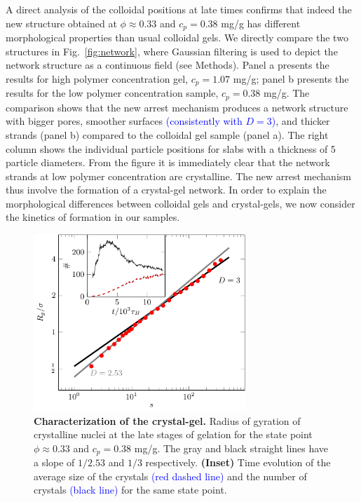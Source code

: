 \documentclass[preprint,amsmath,amssymb,superscriptaddress]{revtex4-1}
\begin{document}
A direct analysis of the colloidal positions at late times confirms that indeed the new structure obtained at
$\phi\approx 0.33$ and $c_p=0.38$ mg/g has different morphological properties than usual colloidal gels.
We directly compare the two structures in Fig.~\ref{fig:network}, where Gaussian filtering is used to depict the network structure as a continuous field (see Methods).
Panel a presents the results for high
polymer concentration gel, $c_p=1.07$ mg/g; panel b presents the results for the low polymer concentration sample, $c_p=0.38$ mg/g.
The comparison shows that the new arrest mechanism produces a network structure with bigger pores, smoother surfaces \textcolor{blue}{(consistently with $D=3$)}, and thicker strands (panel b) compared
to the colloidal gel sample (panel a). The right column shows the individual particle positions for slabs with a thickness of 5 particle diameters. 
From the figure it is immediately clear that the network strands at low polymer concentration are crystalline. The new arrest mechanism thus
involve the formation of a crystal-gel network. In order to explain the morphological differences between colloidal gels and crystal-gels,
we now consider the kinetics of formation in our samples. 

\begin{figure}
 \includegraphics[width=8cm]{characterisation}
\caption{{\bf Characterization of the crystal-gel.} 
Radius of gyration of crystalline nuclei at the late stages of gelation for the state point $\phi\approx 0.33$ and $c_p=0.38$ mg/g.
The gray and black straight lines have a slope of $1/2.53$ and $1/3$ respectively. 
\textbf{(Inset)} Time evolution of the average size of the crystals \textcolor{blue}{(red dashed line)} and the number of crystals 
\textcolor{blue}{(black line)} for the same state point.
} 
 \label{fig:crystals}
\end{figure}
\end{document}
